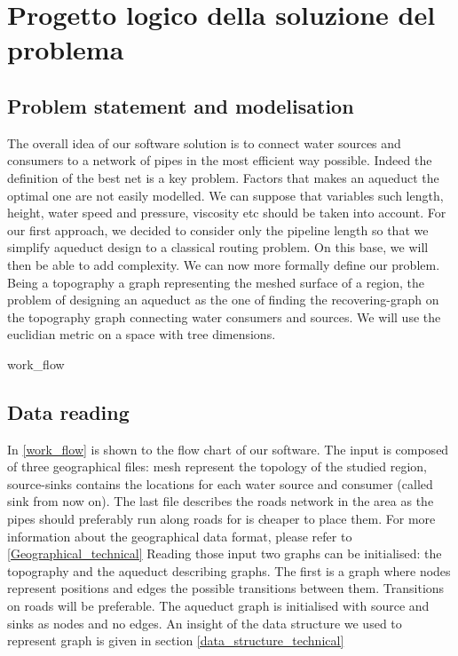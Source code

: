 \chapter{Progetto logico della soluzione del problema}
\label{capitolo4}
\thispagestyle{empty}

\section {Problem statement and modelisation}
The overall idea of our software solution is to connect water sources and consumers to a network of pipes in the most efficient way possible. Indeed the definition of the best net is a key problem. Factors that makes an aqueduct the optimal one are not easily modelled. We can suppose that variables such length, height, water speed and pressure, viscosity etc should be taken into account.
\hfill For our first approach, we decided to consider only the pipeline length so that we simplify aqueduct design to a classical routing problem. On this base, we will then be able to add complexity.
\hfill We can now more formally define our problem. Being a topography a graph representing the meshed surface of a region, the problem of designing an aqueduct as the one of finding the recovering-graph on the topography graph connecting water consumers and sources. We will use the euclidian metric on a space with tree dimensions.

 {work_flow}

\section {Data reading}
In \ref {work_flow} is shown to the flow chart of our software. 
The input is composed of three geographical files: mesh represent the topology of the studied region, source-sinks contains the locations for each water source and consumer (called sink from now on). The last file describes the roads network in the area as the pipes should preferably run along roads for is cheaper to place them. For more information about the geographical data format, please refer to \ref{Geographical_technical}
Reading those input two graphs can be initialised: the topography and the aqueduct describing graphs. The first is a graph where nodes represent positions and edges the possible transitions between them. Transitions on roads will be preferable. The aqueduct graph is initialised with source and sinks as nodes and no edges. An insight of the data structure we used to represent graph is given in section \ref {data_structure_technical}

